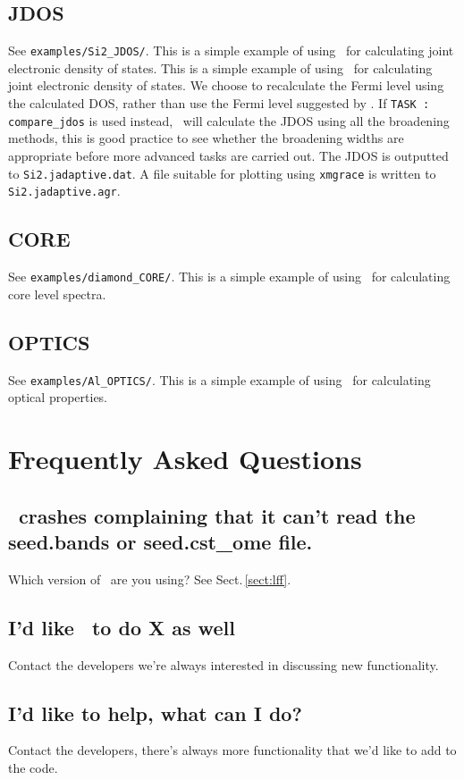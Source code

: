 \documentclass[a4paper,11pt,twoside]{book}
\begin{document}
{\section{JDOS}
See  \verb#examples/Si2_JDOS/#. This is a simple example of using \optados\ for calculating joint electronic density of states. This is a simple example of using \optados\ for calculating joint electronic density of states.  We choose to recalculate the Fermi level using the calculated DOS, rather than use the Fermi level suggested by \castep.  If {\tt TASK : compare\_jdos} is used instead, \optados\ will calculate the JDOS using all the broadening methods, this is good practice to see whether the broadening widths are appropriate before more advanced tasks are carried out.  The JDOS is outputted to {\tt Si2.jadaptive.dat}. A file suitable for plotting using {\tt xmgrace} is written to {\tt Si2.jadaptive.agr}. 

\section{CORE}
See  \verb#examples/diamond_CORE/#. This is a simple example of using \optados\ for calculating core level spectra. 

\section{OPTICS}
See  \verb#examples/Al_OPTICS/#. This is a simple example of using \optados\ for calculating optical properties. 

\chapter{Frequently Asked Questions}

\section{\optados\ crashes complaining that it can't read the
  seed.bands or seed.cst\_ome file.}
Which version of \castep\ are you using? See Sect.\,\ref{sect:lff}.

\section{I'd like \optados\ to do X as well}
Contact the developers we're always interested in discussing new functionality.

\section{I'd like to help, what can I do?}
Contact the developers, there's always more functionality that we'd
like to add to the code.  

}
\end{document}
